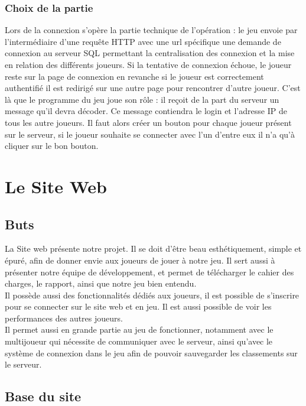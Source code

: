 \documentclass[12pt]{article}
\begin{document}
\subsubsection{Choix de la partie}

Lors de la connexion s’opère la partie technique de l’opération : le jeu envoie par l’intermédiaire d’une requête HTTP avec une url spécifique une demande de connexion au serveur SQL permettant la centralisation des connexion et la mise en relation des différents joueurs. Si la tentative de connexion échoue, le joueur reste sur la page de connexion en revanche si le joueur est correctement authentifié il est redirigé sur une autre page pour rencontrer d’autre joueur. C’est là que le programme du jeu joue son rôle : il reçoit de la part du serveur un message qu’il devra décoder. Ce message contiendra le login et l’adresse IP de tous les autre joueurs. Il faut alors créer un bouton pour chaque joueur présent sur le serveur, si le joueur souhaite se connecter avec l’un d’entre eux il n’a qu’à cliquer sur le bon bouton.

\section{Le Site Web}

\subsection{Buts}

La Site web présente notre projet. Il se doit d'être beau esthétiquement, simple et épuré, afin de donner envie aux joueurs de jouer à notre jeu. Il sert aussi à présenter notre équipe de développement, et permet de télécharger le cahier des charges, le rapport, ainsi que notre jeu bien entendu.\\
Il possède aussi des fonctionnalités dédiés aux joueurs, il est possible de s'inscrire pour se connecter sur le site web et en jeu. Il est aussi possible de voir les performances des autres joueurs.\\
Il permet aussi en grande partie au jeu de fonctionner, notamment avec le multijoueur qui nécessite de communiquer avec le serveur, ainsi qu'avec le système de connexion dans le jeu afin de pouvoir sauvegarder les classements sur le serveur.

\subsection{Base du site}
\end{document}
